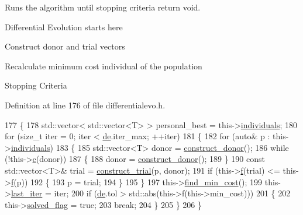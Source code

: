 Runs the algorithm until stopping criteria return void. 

Differential Evolution starts here

Construct donor and trial vectors

Recalculate minimum cost individual of the population

Stopping Criteria 

Definition at line 176 of file differentialevo.\+h.


\begin{DoxyCode}
177     \{
178         std::vector< std::vector<T> > personal\_best = this->\hyperlink{classea_1_1_solver__base_ad75bc440d24a46e97694c7c889f2ecde}{individuals};
180         \textcolor{keywordflow}{for} (\textcolor{keywordtype}{size\_t} iter = 0; iter < \hyperlink{classea_1_1_solver_3_01_d_e_00_01_t_00_01_f_00_01_c_01_4_a789b8665ce321248e3999907c37d0963}{de}.iter\_max; ++iter)
181         \{
182             \textcolor{keywordflow}{for} (\textcolor{keyword}{auto}& p : this->\hyperlink{classea_1_1_solver__base_ad75bc440d24a46e97694c7c889f2ecde}{individuals})
183             \{
185                 std::vector<T> donor = \hyperlink{classea_1_1_solver_3_01_d_e_00_01_t_00_01_f_00_01_c_01_4_a69dabdddba116ddb5685355119bd77e0}{construct\_donor}();
186                 \textcolor{keywordflow}{while} (!this->\hyperlink{classea_1_1_solver__base_a6914e89d30e7484f2b4af1783f0de8c3}{c}(donor))
187                 \{
188                     donor = \hyperlink{classea_1_1_solver_3_01_d_e_00_01_t_00_01_f_00_01_c_01_4_a69dabdddba116ddb5685355119bd77e0}{construct\_donor}();
189                 \}
190                 \textcolor{keyword}{const} std::vector<T>& trial = \hyperlink{classea_1_1_solver_3_01_d_e_00_01_t_00_01_f_00_01_c_01_4_a043f8134c53f09519283b8320d7a2ade}{construct\_trial}(p, donor);
191                 \textcolor{keywordflow}{if} (this->\hyperlink{classea_1_1_solver__base_ae0a893780c93dfe17c1d17301de6494f}{f}(trial) <= this->\hyperlink{classea_1_1_solver__base_ae0a893780c93dfe17c1d17301de6494f}{f}(p))
192                 \{
193                     p = trial;
194                 \}
195             \}
197             this->\hyperlink{classea_1_1_solver__base_ac69a6c714298054039acbbbf5d2eea23}{find\_min\_cost}();
199             this->\hyperlink{classea_1_1_solver__base_a8f9a321eb87e57636cf0b0f3a57b6fc2}{last\_iter} = iter;
200             \textcolor{keywordflow}{if} (\hyperlink{classea_1_1_solver_3_01_d_e_00_01_t_00_01_f_00_01_c_01_4_a789b8665ce321248e3999907c37d0963}{de}.tol > std::abs(this->f(this->min\_cost)))
201             \{
202                 this->\hyperlink{classea_1_1_solver__base_a1cdb824e8df6d4a8f228820ea85c9b05}{solved\_flag} = \textcolor{keyword}{true};
203                 \textcolor{keywordflow}{break};
204             \}
205         \}
206     \}
\end{DoxyCode}
\mbox{\label{classea_1_1_solver_3_01_d_e_00_01_t_00_01_f_00_01_c_01_4_a86a25b0977865969248efd4e79e4982f}} 
